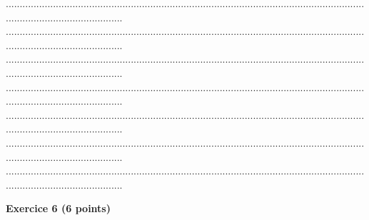 \documentclass{article}
\begin{document}
\begin{footnotesize}
\begin{enumerate}
\begin{enumerate}
        ...........................................................................................................................................................................\newline
        ...........................................................................................................................................................................\newline
        ...........................................................................................................................................................................\newline
        ...........................................................................................................................................................................\newline
        ...........................................................................................................................................................................\newline
        ...........................................................................................................................................................................\newline
        ...........................................................................................................................................................................\newline\newline\newline
    \end{enumerate}
\end{enumerate}
\end{footnotesize}
\noindent\textbf{Exercice 6 (6 points)}\newline
\end{document}

